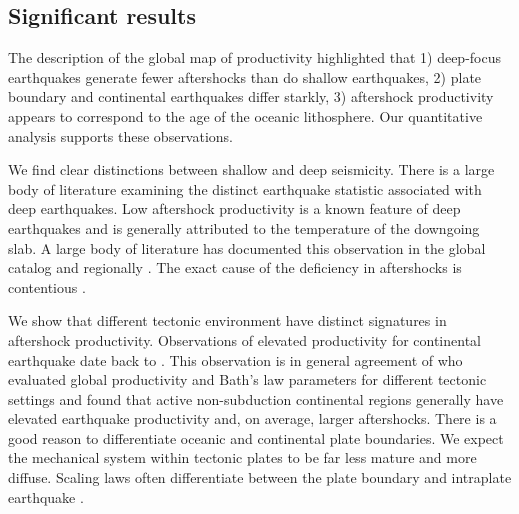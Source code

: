\documentclass[12pt, notitlepage]{report}
\begin{document}







\subsection{Significant results}

The description of the global map of productivity highlighted that 1) deep-focus earthquakes generate fewer aftershocks than do shallow earthquakes, 2) plate boundary and continental earthquakes differ starkly, 3) aftershock productivity appears to correspond to the age of the oceanic lithosphere. Our quantitative analysis supports these observations. 

We find clear distinctions between shallow and deep seismicity. There is a large body of literature examining the distinct earthquake statistic associated with deep earthquakes. Low aftershock productivity is a known feature of deep earthquakes and is generally attributed to the temperature of the downgoing slab. A large body of literature has documented this observation in the global catalog \cite{Bath1965LateralMantle, Frohlich1987AftershocksEarthquakes,Nyffenegger2000} and regionally \cite{Wiens1997AftershockZone, Wu1999}. The exact cause of the deficiency in aftershocks is contentious \cite{Nyffenegger2000}.

We show that different tectonic environment have distinct signatures in aftershock productivity. Observations of elevated productivity for continental earthquake date back to \cite{Mogi1967EarthquakesFractures, Davis1991Single-linkVariations}. This observation is in general agreement of \textcite{Page} who evaluated global productivity and Bath's law parameters for different tectonic settings and found that active non-subduction continental regions generally have elevated earthquake productivity and, on average, larger aftershocks. There is a good reason to differentiate oceanic and continental plate boundaries. We expect the mechanical system within tectonic plates to be far less mature and more diffuse. Scaling laws often differentiate between the plate boundary and intraplate earthquake \cite{Scholz2019TheFaulting}. 
\end{document}
